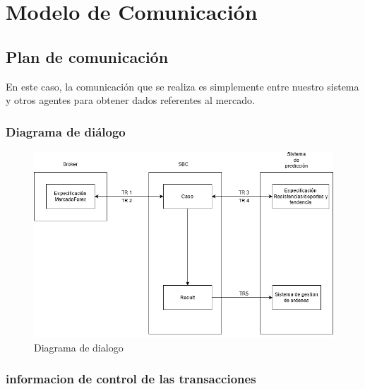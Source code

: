 

\chapter{Modelo de Comunicación}

\section{Plan de comunicación}
En este caso, la comunicación que se realiza es simplemente entre nuestro sistema y otros agentes para obtener dados referentes al mercado.

\subsection{Diagrama de diálogo}

  \begin{figure}[H]
    \centering
    \includegraphics[scale=0.50]{imaxes/Comunicaciones.png}
    \caption{\label{fig:Comunicaciones}Diagrama de dialogo}
  \end{figure}
  
\subsection{informacion de control de las transacciones}

